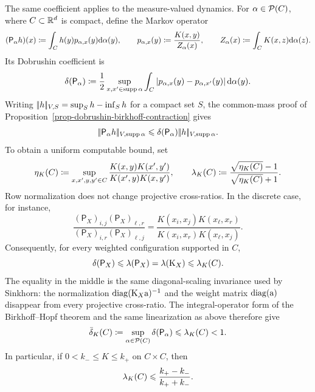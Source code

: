 The same coefficient applies to the measure-valued dynamics. For $\alpha\in\mathcal{P}(C)$, where $C\subset\mathbb{R}^d$ is compact, define the Markov operator
\begin{equation}\label{eq-mean-shift-markov-operator}
	(\mathsf P_\alpha h)(x)
	\coloneqq
	\int_C h(y)p_{\alpha,x}(y)\mathrm{d}\alpha(y),
	\qquad
	p_{\alpha,x}(y)
	\coloneqq
	\frac{K(x,y)}{Z_\alpha(x)},
	\qquad
	Z_\alpha(x)
	\coloneqq
	\int_C K(x,z)\mathrm{d}\alpha(z).
\end{equation}
Its Dobrushin coefficient is
\begin{equation}\label{eq-mean-shift-continuous-dobrushin}
	\delta(\mathsf P_\alpha)
	\coloneqq
	\frac12\sup_{x,x'\in\operatorname{supp}\alpha}
	\int_C\left\lvert p_{\alpha,x}(y)-p_{\alpha,x'}(y)\right\rvert\mathrm{d}\alpha(y).
\end{equation}
Writing $|\!| h |\!|_{V,S}=\sup_S h-\inf_S h$ for a compact set $S$, the common-mass proof of Proposition~\ref{prop-dobrushin-birkhoff-contraction} gives
\[
	|\!| \mathsf P_\alpha h |\!|_{V,\operatorname{supp}\alpha}
	\leqslant
	\delta(\mathsf P_\alpha)|\!| h |\!|_{V,\operatorname{supp}\alpha}.
\]
To obtain a uniform computable bound, set
\begin{equation}\label{eq-mean-shift-kernel-birkhoff-factor}
	\eta_K(C)
	\coloneqq
	\sup_{x,x',y,y'\in C}
	\frac{K(x,y)K(x',y')}{K(x',y)K(x,y')},
	\qquad
	\lambda_K(C)
	\coloneqq
	\frac{\sqrt{\eta_K(C)}-1}{\sqrt{\eta_K(C)}+1}.
\end{equation}
Row normalization does not change projective cross-ratios. In the discrete case, for instance,
\begin{equation}\label{eq-mean-shift-cross-ratio}
	\frac{(\mathsf P_X)_{i,j}(\mathsf P_X)_{\ell,r}}
	     {(\mathsf P_X)_{i,r}(\mathsf P_X)_{\ell,j}}
	=
	\frac{K(x_i,x_j)K(x_\ell,x_r)}
	     {K(x_i,x_r)K(x_\ell,x_j)}.
\end{equation}
Consequently, for every weighted configuration supported in $C$,
\begin{equation}\label{eq-mean-shift-projective-chain}
	\delta(\mathsf P_X)
	\leqslant
	\lambda(\mathsf P_X)
	=
	\lambda(\mathrm{K}_X)
	\leqslant
	\lambda_K(C).
\end{equation}
The equality in the middle is the same diagonal-scaling invariance used by Sinkhorn: the normalization $\operatorname{diag}(\mathrm{K}_X\mathrm{a})^{-1}$ and the weight matrix $\operatorname{diag}(\mathrm{a})$ disappear from every projective cross-ratio.
The integral-operator form of the Birkhoff--Hopf theorem and the same linearization as above therefore give
\begin{equation}\label{eq-mean-shift-uniform-dobrushin}
	\bar\delta_K(C)
	\coloneqq
	\sup_{\alpha\in\mathcal{P}(C)}\delta(\mathsf P_\alpha)
	\leqslant
	\lambda_K(C)<1.
\end{equation}
In particular, if $0<k_-\leq K\leq k_+$ on $C\times C$, then
\begin{equation}\label{eq-mean-shift-coarse-birkhoff-bound}
	\lambda_K(C)
	\leqslant
	\frac{k_+-k_-}{k_++k_-}.
\end{equation}


